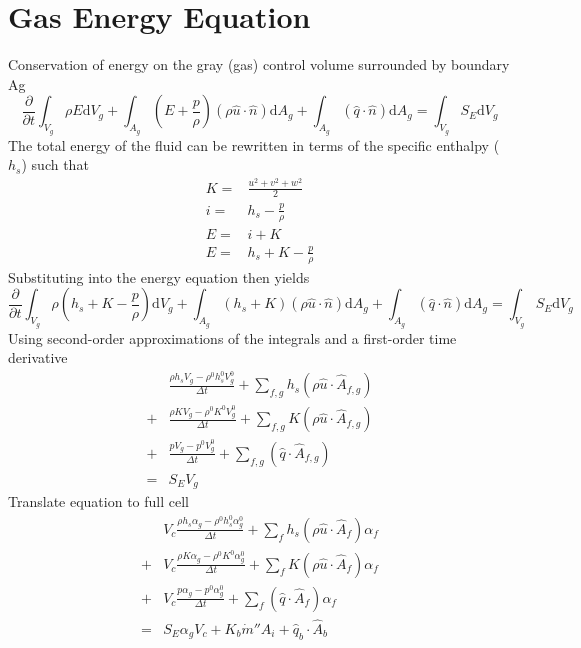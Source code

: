 \documentclass{article}
\renewcommand{\vec}[1]{\ensuremath{\hat{#1}}}
\renewcommand{\d}{\mathrm{d}}
\begin{document}
  \section{Gas Energy Equation}
    Conservation of energy on the gray (gas) control volume surrounded by boundary Ag
    \begin{equation*}
        \frac{\partial}{\partial t}\int_{V_g} \rho E \d V_g
      + \int_{A_g} (E + \frac{p}{\rho}) (\rho \vec{u} \cdot \vec{n}) \d A_g
      + \int_{A_g} (\vec{q} \cdot \vec{n}) \d A_g
      = \int_{V_g} S_{E} \d V_g
    \end{equation*}
    The total energy of the fluid can be rewritten in terms of the specific enthalpy ($h_s$) such that
    \begin{align*}
      K =& \frac{u^2 + v^2 + w^2}{2} \\
      i =& h_s - \frac{p}{\rho} \\
      E =& i + K \\
      E =& h_s + K - \frac{p}{\rho}
    \end{align*}
    Substituting into the energy equation then yields
    \begin{equation*}
          \frac{\partial}{\partial t}\int_{V_g} \rho (h_s + K - \frac{p}{\rho}) \d V_g
        + \int_{A_g} (h_s + K) (\rho \vec{u} \cdot \vec{n}) \d A_g
        + \int_{A_g} (\vec{q} \cdot \vec{n}) \d A_g
        = \int_{V_g} S_{E} \d V_g
    \end{equation*}
    Using second-order approximations of the integrals and a first-order time derivative
    \begin{align*}
        &\frac{\rho h_s V_g - \rho^0 h_s^0 V_g^0}{\Delta t}
      + \sum_{f,g} h_s (\rho \vec{u}\cdot\vec{A}_{f,g}) \\
      + &\frac{\rho K V_g - \rho^0 K^0 V_g^0}{\Delta t}
      + \sum_{f,g} K (\rho \vec{u}\cdot\vec{A}_{f,g}) \\
      + &\frac{p V_g - p^0 V_g^0}{\Delta t}
      + \sum_{f,g} (\vec{q}\cdot\vec{A}_{f,g}) \\
      = & S_E V_g
    \end{align*}
    Translate equation to full cell
    \begin{align*}
        &V_c \frac{\rho h_s \alpha_g - \rho^0 h_s^0 \alpha_g^0}{\Delta t}
      + \sum_{f} h_s (\rho \vec{u}\cdot\vec{A}_{f}) \alpha_f \\
      + &V_c \frac{\rho K \alpha_g - \rho^0 K^0 \alpha_g^0}{\Delta t}
      + \sum_{f} K (\rho \vec{u}\cdot\vec{A}_{f}) \alpha_f \\
      + &V_c \frac{p \alpha_g - p^0 \alpha_g^0}{\Delta t}
      + \sum_{f} (\vec{q}\cdot\vec{A}_{f}) \alpha_f \\
      = & S_E \alpha_g V_c
      + K_b \dot{m}'' A_i
      + \vec{q}_b \cdot \vec{A}_b
    \end{align*}
\end{document}
